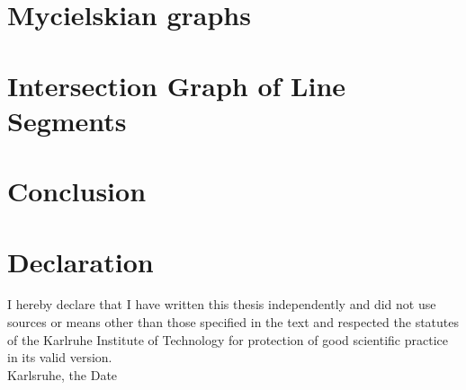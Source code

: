 \documentclass[12pt,a4paper]{scrartcl}
\theoremstyle{plain}
\theoremstyle{definition}
\numberwithin{equation}{section}
\begin{document}
  \section{Mycielskian graphs}\label{secMy}
  
  \newpage
  
  \section{Intersection Graph of Line Segments}\label{secLS}
  
  \newpage
  
  \section{Conclusion}\label{secConc}
  
  \newpage


  \listoffigures
  \newpage
 
  
  
      

  \newpage
  
  \thispagestyle{empty}


  \vspace*{8cm}


  \section*{Declaration}

I hereby declare that I have written this thesis independently and did not use sources or means other than those specified in the text
 and respected the statutes of the Karlruhe Institute of Technology for protection of good scientific practice in its valid version.
\\[2ex] 





  \noindent
Karlsruhe, the Date \\[5ex]

\end{document}

